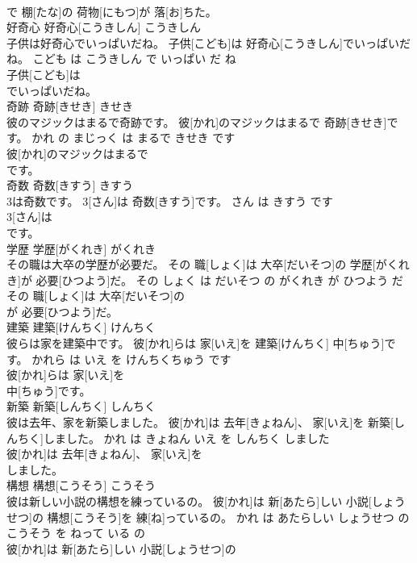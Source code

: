 \documentclass[8pt]{extreport}
\begin{document}
\begin{CJK}{UTF8}{min}
\\	で 棚[たな]の 荷物[にもつ]が 落[お]ちた。			
\\	好奇心	好奇心[こうきしん]	こうきしん	
\\	子供は好奇心でいっぱいだね。	子供[こども]は 好奇心[こうきしん]でいっぱいだね。	こども は こうきしん で いっぱい だ ね	
\\	子供[こども]は
\\	でいっぱいだね。			
\\	奇跡	奇跡[きせき]	きせき	
\\	彼のマジックはまるで奇跡です。	彼[かれ]のマジックはまるで 奇跡[きせき]です。	かれ の まじっく は まるで きせき です	
\\	彼[かれ]のマジックはまるで
\\	です。			
\\	奇数	奇数[きすう]	きすう	
\\	3は奇数です。	3[さん]は 奇数[きすう]です。	さん は きすう です	
\\	3[さん]は
\\	です。			
\\	学歴	学歴[がくれき]	がくれき	
\\	その職は大卒の学歴が必要だ。	その 職[しょく]は 大卒[だいそつ]の 学歴[がくれき]が 必要[ひつよう]だ。	その しょく は だいそつ の がくれき が ひつよう だ	
\\	その 職[しょく]は 大卒[だいそつ]の
\\	が 必要[ひつよう]だ。			
\\	建築	建築[けんちく]	けんちく	
\\	彼らは家を建築中です。	彼[かれ]らは 家[いえ]を 建築[けんちく] 中[ちゅう]です。	かれら は いえ を けんちくちゅう です	
\\	彼[かれ]らは 家[いえ]を
\\	中[ちゅう]です。			
\\	新築	新築[しんちく]	しんちく	
\\	彼は去年、家を新築しました。	彼[かれ]は 去年[きょねん]、 家[いえ]を 新築[しんちく]しました。	かれ は きょねん いえ を しんちく しました	
\\	彼[かれ]は 去年[きょねん]、 家[いえ]を
\\	しました。			
\\	構想	構想[こうそう]	こうそう	
\\	彼は新しい小説の構想を練っているの。	彼[かれ]は 新[あたら]しい 小説[しょうせつ]の 構想[こうそう]を 練[ね]っているの。	かれ は あたらしい しょうせつ の こうそう を ねって いる の	
\\	彼[かれ]は 新[あたら]しい 小説[しょうせつ]の

\end{CJK}
\end{document}
